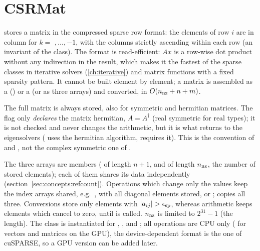 \section{CSRMat}\label{sec:sparse:csr}
 stores a matrix in the compressed sparse row format: the elements of row $i$ are  in
column  for $k=$ $,\ldots,$$-1$, with the columns strictly ascending within
each row (an invariant of the class). The format is read-efficient: $Ax$ is a row-wise dot product without any
indirection in the result, which makes it the fastest of the sparse classes in iterative solvers (\ref{ch:iterative})
and matrix functions with a fixed sparsity pattern. It cannot be built element by element; a matrix is assembled as a
 () or a  (or as three arrays) and converted, in $O(n_{\rm nz}+n+m)$.

The full matrix is always stored, also for symmetric and hermitian matrices. The flag  only
\emph{declares} the matrix hermitian, $A=A^\dagger$ (real symmetric for real types); it is not checked and never changes the
arithmetic, but it is what  returns to the eigensolvers ( uses the hermitian algorithm,
 requires it). This is the convention of  and , not the complex symmetric
one of .

The three arrays are  members ( of length $n+1$,  and  of length $n_{\rm nz}$, the
number of stored elements); each of them shares its data independently (section~\ref{sec:concepts:refcount}). Operations which
change only the values keep the index arrays shared, e.g.\ ,  with all diagonal elements stored, or
;  copies all three. Conversions store only elements with $|a_{ij}|>\epsilon_{\rm sp}$,
whereas arithmetic keeps elements which cancel to zero, until  is called. $n_{\rm nz}$ is limited to $2^{31}-1$
(the  length). The class is instantiated for , ,  and
; all operations are CPU only ( for vectors and matrices on the GPU), the device-dependent
format is the one of cuSPARSE, so a GPU version can be added later.

